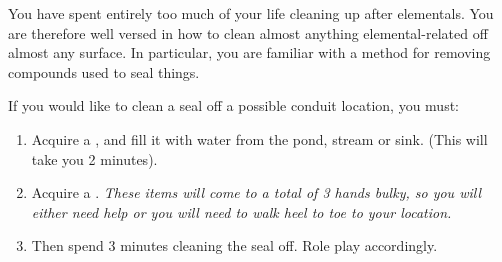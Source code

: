 \documentclass[green]{elementals}
\begin{document}
\name{\gUnsealConduit{}} 

You have spent entirely too much of your life cleaning up after elementals. You are therefore well versed in how to clean almost anything elemental-related off almost any surface. In particular, you are familiar with a method for removing compounds used to seal things. 

If you would like to clean a seal off a possible conduit location, you must: 
\begin{enumerate}
\item Acquire a \iBowl{}, and fill it with water from the pond, stream or sink. (This will take you 2 minutes).
\item Acquire a \iLye{}. \emph{These items will come to a total of 3 hands bulky, so you will either need help or you will need to  walk heel to toe to your location.} 
\item Then spend 3 minutes cleaning the seal off. Role play accordingly.
\end{enumerate}
\end{document}
